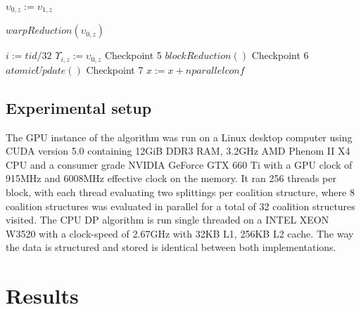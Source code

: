 \documentclass{aamas2012}
\begin{document}
\begin{algorithm}
\begin{algorithmic}[1]
      \STATE $\upsilon_{0,z} := \upsilon_{1,z}$
    \ENDIF
    
    \STATE $warpReduction(\upsilon_{0,z})$

      \STATE $i := tid / 32$
      \STATE $\Upsilon_{i,z} := \upsilon_{0,z}$
    \ENDIF
  \ENDFOR   \hfill Checkpoint 5
  \STATE $blockReduction()$
  \hfill Checkpoint 6
  \STATE $atomicUpdate()$\label{lst:line:reductionend} 
  \ENDIF  \hfill Checkpoint 7
  \STATE $x := x + nparallelconf$
\ENDFOR
\end{algorithmic}
\end{algorithm}

\subsection{Experimental setup}

The GPU instance of the algorithm was run on a Linux desktop computer using CUDA version 5.0 containing 12GiB DDR3 RAM, 
3.2GHz AMD Phenom II X4 CPU and a consumer grade NVIDIA GeForce GTX 660 Ti with a GPU clock of 915MHz and 6008MHz effective clock on the memory.
It ran 256 threads per block, with each thread evaluating two splittings per coalition structure, 
where 8 coalition structures was evaluated in parallel for a total of 32 coalition structures visited.
The CPU DP algorithm is run single threaded on a INTEL XEON W3520 with a clock-speed of 2.67GHz with 32KB L1, 256KB L2 cache. 
The way the data is structured and stored is identical between both implementations.
\section{Results}
\end{document}
